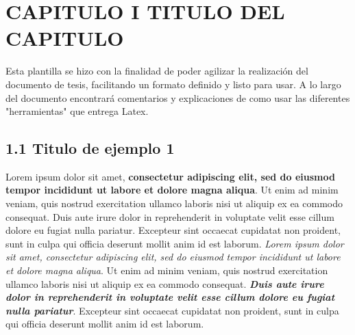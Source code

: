 
\chapter*{CAPITULO I TITULO DEL CAPITULO}


Esta plantilla se hizo con la finalidad de poder agilizar la realización del documento de tesis, facilitando un formato definido y listo para usar. A lo largo del documento encontrará comentarios y explicaciones de como usar las diferentes "herramientas" que entrega Latex.

\section{1.1 Titulo de ejemplo 1}

Lorem ipsum dolor sit amet, \textbf{consectetur adipiscing elit, sed do eiusmod tempor incididunt ut labore et dolore magna aliqua}. Ut enim ad minim veniam, quis nostrud exercitation ullamco laboris nisi ut aliquip ex ea commodo consequat. Duis aute irure dolor in reprehenderit in voluptate velit esse cillum dolore eu fugiat nulla pariatur. Excepteur sint occaecat cupidatat non proident, sunt in culpa qui officia deserunt mollit anim id est laborum.
\textit{Lorem ipsum dolor sit amet, consectetur adipiscing elit, sed do eiusmod tempor incididunt ut labore et dolore magna aliqua}. Ut enim ad minim veniam, quis nostrud exercitation ullamco laboris nisi ut aliquip ex ea commodo consequat. \textbf{\textit{Duis aute irure dolor in reprehenderit in voluptate velit esse cillum dolore eu fugiat nulla pariatur}}. Excepteur sint occaecat cupidatat non proident, sunt in culpa qui officia deserunt mollit anim id est laborum.

